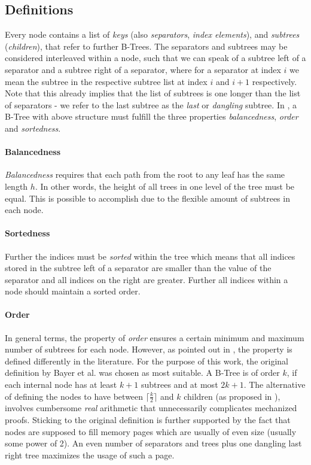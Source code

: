\subsection{Definitions}
\label{sec:data_structure_defs}

Every node contains a list of \textit{keys} (also \textit{separators}, \textit{index elements}), and \textit{subtrees} (\textit{children}),
that refer to further B-Trees.
The separators and subtrees may be considered interleaved within a node,
such that we can speak of a subtree left of a separator and a subtree right of a separator,
where for a separator at index $i$ we mean the subtree in the respective
subtree list at index $i$ and $i+1$ respectively.
Note that this already implies that the list of subtrees is one
longer than the list of separators - we refer to the last subtree
as the \textit{last} or \textit{dangling} subtree.
In \parencite{DBLP:journals/acta/BayerM72},
a B-Tree with above structure must fulfill the three properties
\textit{balancedness}, \textit{order} and \textit{sortedness}.

\paragraph{Balancedness} \textit{Balancedness} requires
that each path from the root to any leaf has the same length $h$.
In other words, the height of all trees in one level of the tree must be equal.
This is possible to accomplish due to the flexible amount of subtrees
in each node.

\paragraph{Sortedness} Further the indices must be \textit{sorted} within the tree which means that all indices stored
in the subtree left of a separator are smaller than the value of the separator
and all indices on the right are greater.
Further all indices within a node should maintain a sorted order.

\paragraph{Order} In general terms, the property of \textit{order} ensures a certain minimum and maximum
number of subtrees for each node.
However, as pointed out in \parencite{DBLP:books/daglib/0095349_mod},
the property is defined differently in the literature.
For the purpose of this work, the original definition by Bayer et al. was chosen as most suitable.
A B-Tree is of order $k$, if each internal node has at least $k+1$
subtrees and at most $2k+1$.
The alternative of defining the nodes to have between $\lceil \frac{k}{2} \rceil$
and $k$ children (as proposed in \parencite{DBLP:books/lib/Knuth98a}),
involves cumbersome \textit{real} arithmetic that unnecessarily complicates
mechanized proofs.
Sticking to the original definition is further supported by the fact that nodes are supposed
to fill memory pages which are usually of even size (usually some power of 2).
An even number of separators and trees plus one dangling last right tree maximizes
the usage of such a page.


